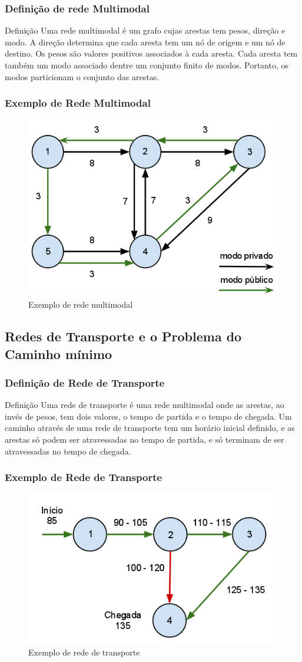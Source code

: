 \frame
{
\frametitle{Definição de rede Multimodal}
\begin{block}{Definição}
Uma rede multimodal é um grafo cujas arestas tem pesos, direção e modo. A direção determina que cada aresta tem um nó de origem e um nó de destino.
Os pesos são valores positivos associados à cada aresta. Cada aresta tem também um modo associado dentre um conjunto finito de modos. Portanto, os modos particionam o conjunto das arestas.
\end{block}
}

\frame
{
\frametitle{Exemplo de Rede Multimodal}
	\begin{figure}
		\includegraphics[width=.8\textwidth]{./imgs/multimodal.png}
		\caption{Exemplo de rede multimodal}
	\end{figure}
}

\subsection{Redes de Transporte e o Problema do Caminho mínimo}
\frame
{
\frametitle{Definição de Rede de Transporte}
\begin{block}{Definição}
Uma rede de transporte é uma rede multimodal onde as arestas, ao invés de pesos, tem dois valores, o tempo de partida e o tempo de chegada. Um caminho através de uma rede de transporte tem um horário inicial definido, e as arestas só podem ser atravessadas no tempo de partida, e só terminam de ser atravessadas no tempo de chegada.
\end{block}
}

\frame
{
\frametitle{Exemplo de Rede de Transporte}
	\begin{figure}
		\includegraphics[width=.8\textwidth]{./imgs/redetransporte.png}
		\caption{Exemplo de rede de transporte}
	\end{figure}
}

